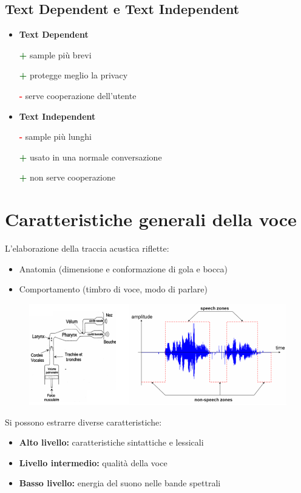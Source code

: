 \documentclass{report}
\begin{document}
\subsection{Text Dependent e Text Independent}
\begin{itemize}
    \item \textbf{Text Dependent}
    
    \textcolor{darkgreen}{\textbf{+}} sample più brevi

    \textcolor{darkgreen}{\textbf{+}} protegge meglio la privacy

    \textcolor{red}{\textbf{-}} serve cooperazione dell'utente 
    \item \textbf{Text Independent}
    
    \textcolor{red}{\textbf{-}} sample più lunghi

    \textcolor{darkgreen}{\textbf{+}} usato in una normale conversazione

    \textcolor{darkgreen}{\textbf{+}} non serve cooperazione
\end{itemize}

\section{Caratteristiche generali della voce}
L'elaborazione della traccia acustica riflette:
\begin{itemize}
    \item Anatomia (dimensione e conformazione di gola e bocca)
    \item Comportamento (timbro di voce, modo di parlare)
\end{itemize}

\begin{figure}[ht]
    \centering
    \includegraphics[width=1\linewidth]{images/voce-char.png}
\end{figure}

\newpage
\noindent Si possono estrarre diverse caratteristiche:
\begin{itemize}
    \item \textbf{Alto livello:} caratteristiche sintattiche e lessicali
    \item \textbf{Livello intermedio:} qualità della voce 
    \item \textbf{Basso livello:} energia del suono nelle bande spettrali
\end{itemize}
\end{document}
